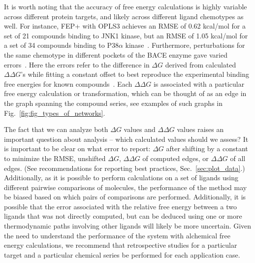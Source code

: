 \documentclass[9pt,bestpractices]{livecoms}
\begin{document}
It is worth noting that the accuracy of free energy calculations is highly variable across different protein targets, and likely across different ligand chemotypes as well.
For instance, FEP+ with OPLS3 achieves an RMSE of 0.62 kcal/mol for a set of 21 compounds binding to JNK1 kinase, but an RMSE of 1.05 kcal/mol for a set of 34 compounds binding to P38$\alpha$ kinase~\cite{harder2016opls3}.
Furthermore, perturbations for the same chemotype in different pockets of the BACE enzyme gave varied errors~\cite{keranen2017acylguanidine}. Here the errors refer to the difference in $\Delta G$ derived from calculated $\Delta \Delta G$'s while fitting a constant offset to best reproduce the experimental binding free energies for known compounds~\cite{wang2015accurate}. Each $\Delta \Delta G$ is associated with a particular free energy calculation or transformation, which can be thought of as an edge in the graph spanning the compound series, see examples of such graphs in Fig.~\ref{fig:fig_types_of_networks}.

The fact that we can analyze both $\Delta G$ values and $\Delta \Delta G$ values raises an important question about analysis -- which calculated values should we assess? It is important to be clear on what error to report: $\Delta G$ after shifting by a constant to minimize the RMSE, unshifted $\Delta G$, $\Delta \Delta G$ of computed edges, or $\Delta \Delta G$ of all edges. (See recommendations for reporting best practices, Sec.~\ref{sec:plot_data}.) Additionally, as it is possible to perform calculations on a set of ligands using different pairwise comparisons of molecules, the performance of the method may be biased based on which pairs of comparisons are performed. Additionally, it is possible that the error associated with the relative free energy between a two ligands that was not directly computed,  but can be deduced using one or more thermodynamic paths involving other ligands will likely be more uncertain.
Given the need to understand the performance of the system with alchemical free energy calculations, we recommend that retrospective studies for a particular target and a particular chemical series be performed for each application case.
\end{document}
